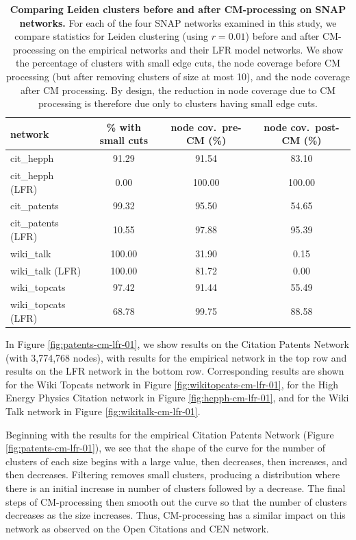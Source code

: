 \documentclass[11pt]{article}   	%
\begin{document}
\begin{table}[ht]
\centering
\begin{tabular}{lccc}
  \hline
 network & \% with small cuts & node cov.~pre-CM (\%) & node cov.~post-CM (\%) \\
  \hline
  cit\_hepph  & 91.29 & 91.54 & 83.10 \\
  cit\_hepph (LFR) & 0.00 & 100.00 & 100.00 \\
  \hline
  cit\_patents & 99.32 & 95.50 & 54.65\\
    cit\_patents  (LFR) & 10.55 & 97.88 & 95.39\\
  \hline
  wiki\_talk & 100.00 & 31.90 & 0.15\\
    wiki\_talk (LFR) & 100.00 & 81.72 & 0.00\\
  \hline
  wiki\_topcats & 97.42 & 91.44 & 55.49 \\
   wiki\_topcats  (LFR)& 68.78 & 99.75 & 88.58 \\
   \hline
\end{tabular}
\caption{\textbf{Comparing Leiden clusters before and after CM-processing  on SNAP networks.} For each of the four SNAP networks
examined in this study, we compare statistics for Leiden clustering (using $r=0.01$) before and after CM-processing on the empirical networks and their LFR model
networks. We show the percentage of clusters with small edge cuts, the node coverage before CM processing (but after removing clusters of size at most 10), and the node coverage
after CM processing.  By design, the reduction in node coverage due to CM processing  is therefore due only to clusters having small edge cuts.}
\label{tab:LFR-vs-empirical-SNAP}
\end{table}



In Figure \ref{fig:patents-cm-lfr-01}, we show results on the Citation Patents Network  (with 3,774,768 nodes), with results for the
empirical  network in the top row and results on the LFR network in the bottom row.
Corresponding results are shown for the Wiki Topcats network in Figure \ref{fig:wikitopcats-cm-lfr-01}, for the High Energy Physics Citation network
in Figure \ref{fig:hepph-cm-lfr-01}, and for the Wiki Talk network in Figure  \ref{fig:wikitalk-cm-lfr-01}.



Beginning with the results for the empirical Citation Patents Network (Figure \ref{fig:patents-cm-lfr-01}), we see that the shape of the curve for the number of clusters of each size begins with a large value, then decreases, then increases, and then decreases.
Filtering removes small clusters, producing a distribution where there is an initial increase in number of clusters
followed by a decrease.  The final  steps of CM-processing then smooth out the curve so that the number of clusters decreases as the size increases.
Thus, CM-processing has a similar impact on this network as observed on the Open Citations and CEN network.
\end{document}
